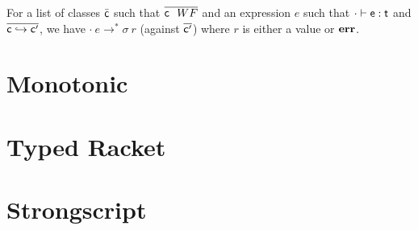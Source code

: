 \documentclass{report}
\newcommand{\e}{\M{\xt{e}}}
\renewcommand{\t}{\M{\xt{t}}}
\renewcommand{\c}{\M{\xt{c}}}
\newcommand{\err}{\M{\bt{err}}}
\newcommand{\M}[1]{\ensuremath{#1}\xspace}
\newcommand{\xt}[1]{{\sf{#1}}\xspace}
\newcommand{\bt}[1]{\xt{\bf #1}}
\renewcommand{\b}[1]{\M{\overline{#1}}}
\newcommand{\EnvType}[3]{ \M{#1 \vdash #2 : #3}}
\newcommand{\TransClass}[2]{\M{ #1 \hookrightarrow #2 }}
\begin{document}
For a list of classes $\bar{\c}$ such that $\b{\c ~~ WF}$ and an expression $e$ such that $\EnvType\cdot\e\t$ and $\b{\TransClass\c{\c'}}$, we have $\cdot~e \rightarrow^* \sigma~r$ (against $\b{\c'}$) where $r$ is either a value or $\err$.


\section{Monotonic}
\section{Typed Racket}
\section{Strongscript}
\end{document}
